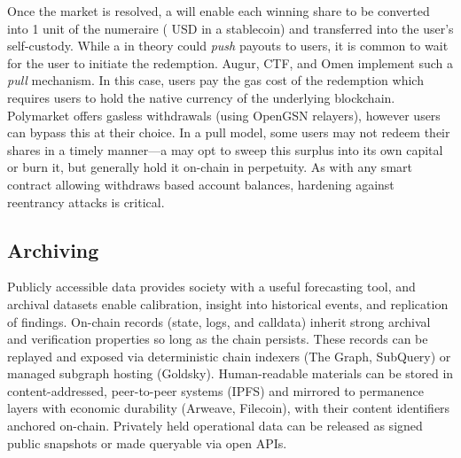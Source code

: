 
Once the market is resolved, a \depm will enable each winning share to be converted into 1 unit of the numeraire ( USD in a stablecoin) and transferred into the user's self-custody. While a \depm in theory could \textit{push} payouts to users, it is common to wait for the user to initiate the redemption. Augur, CTF, and Omen implement such a \textit{pull} mechanism. In this case, users pay the gas cost of the redemption which requires users to hold the native currency of the underlying blockchain. Polymarket offers gasless withdrawals (using OpenGSN relayers), however users can bypass this at their choice. In a pull model, some users may not redeem their shares in a timely manner---a \depm may opt to sweep this surplus into its own capital or burn it, but \depms generally hold it on-chain in perpetuity. As with any smart contract allowing withdraws based account balances, hardening against reentrancy attacks is critical.



\subsection{Archiving}\label{wf:archive}

Publicly accessible \depm data provides society with a useful forecasting tool, and archival datasets enable calibration, insight into historical events, and replication of findings. On-chain records (state, logs, and calldata) inherit strong archival and verification properties so long as the chain persists. These records can be replayed and exposed via deterministic chain indexers (\eg The Graph, SubQuery) or managed subgraph hosting (\eg Goldsky). Human-readable materials can be stored in content-addressed, peer-to-peer systems (\eg IPFS) and mirrored to permanence layers with economic durability (\eg Arweave, Filecoin), with their content identifiers anchored on-chain. Privately held operational data can be released as signed public snapshots or made queryable via open APIs.

